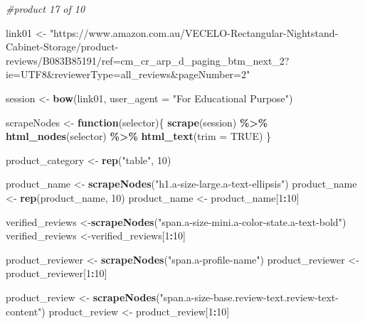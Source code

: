 \documentclass[
]{article}
\newenvironment{Shaded}{\begin{snugshade}}{\end{snugshade}}
\newcommand{\AttributeTok}[1]{\textcolor[rgb]{0.13,0.29,0.53}{#1}}
\newcommand{\CommentTok}[1]{\textcolor[rgb]{0.56,0.35,0.01}{\textit{#1}}}
\newcommand{\ConstantTok}[1]{\textcolor[rgb]{0.56,0.35,0.01}{#1}}
\newcommand{\ControlFlowTok}[1]{\textcolor[rgb]{0.13,0.29,0.53}{\textbf{#1}}}
\newcommand{\DecValTok}[1]{\textcolor[rgb]{0.00,0.00,0.81}{#1}}
\newcommand{\FunctionTok}[1]{\textcolor[rgb]{0.13,0.29,0.53}{\textbf{#1}}}
\newcommand{\NormalTok}[1]{#1}
\newcommand{\OtherTok}[1]{\textcolor[rgb]{0.56,0.35,0.01}{#1}}
\newcommand{\SpecialCharTok}[1]{\textcolor[rgb]{0.81,0.36,0.00}{\textbf{#1}}}
\newcommand{\StringTok}[1]{\textcolor[rgb]{0.31,0.60,0.02}{#1}}
\begin{document}
\begin{Shaded}
\begin{Highlighting}[]
\CommentTok{\#product 17 of 10}

\NormalTok{link01 }\OtherTok{\textless{}{-}} \StringTok{"https://www.amazon.com.au/VECELO{-}Rectangular{-}Nightstand{-}Cabinet{-}Storage/product{-}reviews/B083B85191/ref=cm\_cr\_arp\_d\_paging\_btm\_next\_2?ie=UTF8\&reviewerType=all\_reviews\&pageNumber=2"}


\NormalTok{  session }\OtherTok{\textless{}{-}} \FunctionTok{bow}\NormalTok{(link01,}
               \AttributeTok{user\_agent =} \StringTok{"For Educational Purpose"}\NormalTok{)}

\NormalTok{  scrapeNodes }\OtherTok{\textless{}{-}} \ControlFlowTok{function}\NormalTok{(selector)\{}
    \FunctionTok{scrape}\NormalTok{(session) }\SpecialCharTok{\%\textgreater{}\%}
      \FunctionTok{html\_nodes}\NormalTok{(selector) }\SpecialCharTok{\%\textgreater{}\%}
      \FunctionTok{html\_text}\NormalTok{(}\AttributeTok{trim =} \ConstantTok{TRUE}\NormalTok{)}
\NormalTok{  \}}

\NormalTok{  product\_category }\OtherTok{\textless{}{-}} \FunctionTok{rep}\NormalTok{(}\StringTok{"table"}\NormalTok{, }\DecValTok{10}\NormalTok{)}

\NormalTok{  product\_name }\OtherTok{\textless{}{-}} \FunctionTok{scrapeNodes}\NormalTok{(}\StringTok{"h1.a{-}size{-}large.a{-}text{-}ellipsis"}\NormalTok{)}
\NormalTok{  product\_name }\OtherTok{\textless{}{-}} \FunctionTok{rep}\NormalTok{(product\_name, }\DecValTok{10}\NormalTok{)}
\NormalTok{  product\_name }\OtherTok{\textless{}{-}}\NormalTok{ product\_name[}\DecValTok{1}\SpecialCharTok{:}\DecValTok{10}\NormalTok{]}
  
\NormalTok{  verified\_reviews }\OtherTok{\textless{}{-}}\FunctionTok{scrapeNodes}\NormalTok{(}\StringTok{"span.a{-}size{-}mini.a{-}color{-}state.a{-}text{-}bold"}\NormalTok{)}
\NormalTok{  verified\_reviews }\OtherTok{\textless{}{-}}\NormalTok{verified\_reviews[}\DecValTok{1}\SpecialCharTok{:}\DecValTok{10}\NormalTok{]}
  
\NormalTok{  product\_reviewer }\OtherTok{\textless{}{-}} \FunctionTok{scrapeNodes}\NormalTok{(}\StringTok{"span.a{-}profile{-}name"}\NormalTok{)}
\NormalTok{  product\_reviewer }\OtherTok{\textless{}{-}}\NormalTok{ product\_reviewer[}\DecValTok{1}\SpecialCharTok{:}\DecValTok{10}\NormalTok{]}
  
\NormalTok{  product\_review }\OtherTok{\textless{}{-}} \FunctionTok{scrapeNodes}\NormalTok{(}\StringTok{"span.a{-}size{-}base.review{-}text.review{-}text{-}content"}\NormalTok{)}
\NormalTok{  product\_review }\OtherTok{\textless{}{-}}\NormalTok{ product\_review[}\DecValTok{1}\SpecialCharTok{:}\DecValTok{10}\NormalTok{]}
  

\end{Highlighting}
\end{Shaded}
\end{document}
